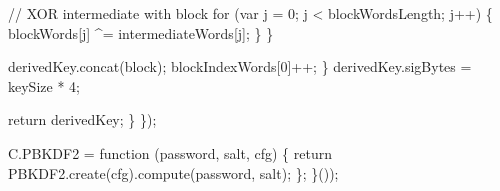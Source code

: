 \begin{DoxyCodeInclude}
                    \textcolor{comment}{// XOR intermediate with block}
                    \textcolor{keywordflow}{for} (var j = 0; j < blockWordsLength; j++) \{
                        blockWords[j] ^= intermediateWords[j];
                    \}
                \}

                derivedKey.concat(block);
                blockIndexWords[0]++;
            \}
            derivedKey.sigBytes = keySize * 4;

            \textcolor{keywordflow}{return} derivedKey;
        \}
    \});

    C.PBKDF2 = \textcolor{keyword}{function} (password, salt, cfg) \{
        \textcolor{keywordflow}{return} PBKDF2.create(cfg).compute(password, salt);
    \};
\}());
\end{DoxyCodeInclude}
 